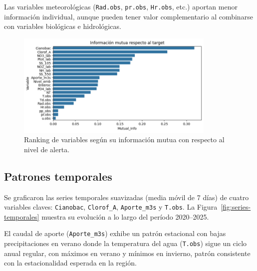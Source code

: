 \documentclass[11pt]{report}
\begin{document}
Las variables meteorológicas (\texttt{Rad.obs}, \texttt{pr.obs}, \texttt{Hr.obs}, etc.) aportan menor información individual, aunque pueden tener valor complementario al combinarse con variables biológicas e hidrológicas.

\begin{figure}[H]
    \centering
    \includegraphics[width=0.85\textwidth]{Imagenes/Mutual_Info_Target.png}
    \caption{Ranking de variables según su información mutua con respecto al nivel de alerta.}
    \label{fig:mutual-info}
\end{figure}


\subsection{Patrones temporales}

Se graficaron las series temporales suavizadas (media móvil de 7 días) de cuatro variables claves: \texttt{Cianobac}, \texttt{Clorof\_A}, \texttt{Aporte\_m3s} y \texttt{T.obs}. La Figura~\ref{fig:series-temporales} muestra su evolución a lo largo del período 2020–2025.

El caudal de aporte (\texttt{Aporte\_m3s}) exhibe un patrón estacional con bajas precipitaciones en verano donde la temperatura del agua (\texttt{T.obs}) sigue un ciclo anual regular, con máximos en verano y mínimos en invierno, patrón consistente con la estacionalidad esperada en la región.
\end{document}
